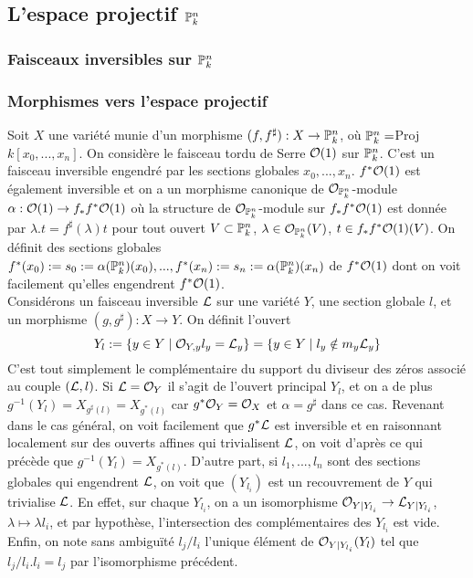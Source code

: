 \subsection{L'espace projectif $\mathbb{P}_k^n$}

\subsubsection{Faisceaux inversibles sur $\mathbb{P}_k^n$}

\subsubsection{Morphismes vers l'espace projectif}
\label{morphismeproj}
Soit $X$ une variété munie d'un morphisme $(f,f^\sharp):X\rightarrow \mathbb{P}^n_k$, où $\mathbb{P}^n_k=$Proj$k[x_0,...,x_n]$. On considère le faisceau tordu de Serre $\mathcal{O}(1)$ sur $\mathbb{P}^n_k$. C'est un faisceau inversible engendré par les sections globales $x_0,...,x_n$. $f^*\mathcal{O}(1)$ est également inversible et on a un morphisme canonique de $\mathcal{O}_{\mathbb{P}^n_k}$-module $\alpha:\mathcal{O}(1)\rightarrow f_*f^*\mathcal{O}(1)$ où la structure de $\mathcal{O}_{\mathbb{P}^n_k}$-module sur $f_*f^*\mathcal{O}(1)$ est donnée par $\lambda.t=f^\sharp(\lambda)t$ pour tout ouvert $V\subset \mathbb{P}^n_k$, $\lambda\in \mathcal{O}_{\mathbb{P}^n_k}(V)$, $t\in f_*f^*\mathcal{O}(1)(V)$. On définit des sections globales $f^*(x_0):=s_0:=\alpha(\mathbb{P}^n_k)(x_0),...,f^*(x_n):=s_n:=\alpha(\mathbb{P}^n_k)(x_n)$ de $f^*\mathcal{O}(1)$ dont on voit facilement qu'elles engendrent $f^*\mathcal{O}(1)$.\\
Considérons un faisceau inversible $\mathcal{L}$ sur une variété $Y$, une section globale $l$, et un morphisme $(g,g^\sharp):X\rightarrow Y$. On définit l'ouvert 
$$Y_l:=\lbrace y\in Y\mid \mathcal{O}_{Y,y}l_y=\mathcal{L}_y\rbrace=\lbrace y\in Y\mid l_y\notin m_y\mathcal{L}_y\rbrace$$
C'est tout simplement le complémentaire du support du diviseur des zéros associé au couple $(\mathcal{L},l)$. Si $\mathcal{L}=\mathcal{O}_Y$ il s'agit de l'ouvert principal $Y_l$, et on a de plus $g^{-1}(Y_l)=X_{g^\sharp(l)}=X_{g^*(l)}$ car $g^*\mathcal{O}_Y=\mathcal{O}_X$ et $\alpha=g^\sharp$ dans ce cas. Revenant dans le cas général, on voit facilement que $g^*\mathcal{L}$ est inversible et en raisonnant localement sur des ouverts affines qui trivialisent $\mathcal{L}$, on voit d'après ce qui précède que $g^{-1}(Y_l)=X_{g^*(l)}$. D'autre part, si $l_1,...,l_n$ sont des sections globales qui engendrent $\mathcal{L}$, on voit que $(Y_{l_i})$ est un recouvrement de $Y$ qui trivialise $\mathcal{L}$. En effet, sur chaque $Y_{l_i}$, on a un isomorphisme $\mathcal{O}_{Y|Y_{l_i}}\rightarrow \mathcal{L}_{Y|Y_{l_i}}$, $\lambda \mapsto \lambda l_i$, et par hypothèse, l'intersection des complémentaires des $Y_{l_i}$ est vide. Enfin, on note sans ambiguïté $l_j/l_i$ l'unique élément de $\mathcal{O}_{Y|Y_{l_i}}(Y_l)$ tel que $l_j/l_i.l_i=l_j$ par l'isomorphisme précédent.\\
